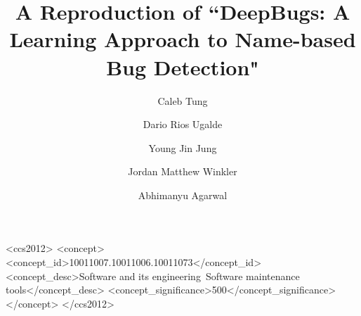 \documentclass[sigconf]{acmart}
\begin{document}
\title{A Reproduction of ``DeepBugs: A Learning Approach to Name-based Bug Detection"}

\author{Caleb Tung}

\author{Dario Rios Ugalde}

\author{Young Jin Jung}

\author{Jordan Matthew Winkler}

\author{Abhimanyu Agarwal}
\renewcommand{\shortauthors}{Caleb et al.}




\begin{CCSXML}
<ccs2012>
   <concept>
       <concept_id>10011007.10011006.10011073</concept_id>
       <concept_desc>Software and its engineering~Software maintenance tools</concept_desc>
       <concept_significance>500</concept_significance>
       </concept>
 </ccs2012>
\end{CCSXML}


\end{document}

